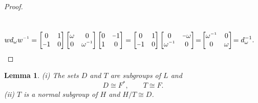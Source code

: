 \documentclass[a4paper , 11pt]{book}
\newcommand{\minus}{\scalebox{0.75}[1.0]{$-$}}
\newtheorem{lemma}[theorem]{Lemma}
\theoremstyle{definition}
\theoremstyle{remark}
\newcommand{\inv}{^{\raisebox{.2ex}{$\scriptscriptstyle-1$}}}
\begin{document}
\begin{proof}
\begin{align*}
\\[1.5ex]
w d_\omega w\inv = \begin{bmatrix} 0 & 1 \\ \minus 1 & 0 \end{bmatrix} \begin{bmatrix} \omega & 0 \\ 0 & \omega\inv \end{bmatrix} \begin{bmatrix} 0 & \minus 1 \\ 1 & 0 \end{bmatrix} &=  \begin{bmatrix} 0 & 1 \\ \minus 1 & 0 \end{bmatrix} \begin{bmatrix} 0 & \minus \omega \\ \omega\inv & 0 \end{bmatrix} \! = \! \begin{bmatrix} \omega\inv & 0 \\ 0 & \omega \end{bmatrix} \!= d^{-1}_\omega. \end{align*}
 
\end{proof}

\begin{lemma}\label{6.1b}
(i) The sets $D$ and $T$ are subgroups of $L$ and
\begin{equation*} D\cong F^*, \qquad T \cong F. \end{equation*}
(ii) $T$ is a normal subgroup of $H$ and $H / T \cong D$.
\end{lemma}
\vspace{0mm}
\end{document}
